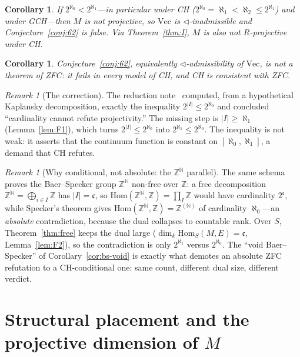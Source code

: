 \documentclass[11pt,reqno]{amsart}
\theoremstyle{plain}
\newtheorem{corollary}[theorem]{Corollary}
\theoremstyle{definition}
\theoremstyle{remark}
\newtheorem{remark}[theorem]{Remark}
\renewcommand{\Vec}{\mathrm{Vec}}
\newcommand{\Hom}{\mathrm{Hom}}
\newcommand{\tri}{\triangleleft}
\newcommand{\N}{\mathbb{N}}
\newcommand{\Z}{\mathbb{Z}}
\begin{document}
\begin{corollary}\label{cor:ch}
If $2^{\aleph_0}<2^{\aleph_1}$---in particular under CH ($2^{\aleph_0}=\aleph_1<\aleph_2\le 2^{\aleph_1}$) and under GCH---then $M$ is not projective, so $\Vec$ is $\tri$-inadmissible and Conjecture~\ref{conj:62} is false. Via Theorem~\ref{thm:I}, $M$ is also not $R$-projective under CH.
\end{corollary}

\begin{corollary}\label{cor:not-zfc}
Conjecture~\ref{conj:62}, equivalently $\tri$-admissibility of $\Vec$, is not a theorem of \textup{ZFC}: it fails in every model of CH, and CH is consistent with \textup{ZFC}.
\end{corollary}

\begin{remark}[The correction]
The reduction note~\cite[(P2)]{macbeth-reduction} computed, from a hypothetical Kaplansky decomposition, exactly the inequality $2^{|I|}\le 2^{\aleph_0}$ and concluded ``cardinality cannot refute projectivity.'' The missing step is $|I|\ge\aleph_1$ (Lemma~\ref{lem:F1}), which turns $2^{|I|}\le 2^{\aleph_0}$ into $2^{\aleph_1}\le 2^{\aleph_0}$. The inequality is not weak: it asserts that the continuum function is constant on $[\aleph_0,\aleph_1]$, a demand that CH refutes.
\end{remark}

\begin{remark}[Why conditional, not absolute: the $\Z^{\N}$ parallel]\label{rem:zn}
The same schema proves the Baer--Specker group $\Z^{\N}$ non-free over $\Z$: a free decomposition $\Z^{\N}=\bigoplus_{i\in I}\Z$ has $|I|=\mathfrak c$, so $\Hom(\Z^{\N},\Z)=\prod_I\Z$ would have cardinality $2^{\mathfrak c}$, while Specker's theorem gives $\Hom(\Z^{\N},\Z)=\Z^{(\N)}$ of cardinality $\aleph_0$---an \emph{absolute} contradiction, because the dual collapses to countable rank. Over $S$, Theorem~\ref{thm:free} keeps the dual large ($\dim_k\Hom_S(M,E)=\mathfrak c$, Lemma~\ref{lem:F2}), so the contradiction is only $2^{\aleph_1}$ versus $2^{\aleph_0}$. The ``void Baer--Specker'' of Corollary~\ref{cor:bs-void} is exactly what demotes an absolute ZFC refutation to a CH-conditional one: same count, different dual size, different verdict.
\end{remark}

\section{Structural placement and the projective dimension of \texorpdfstring{$M$}{M}}\label{sec:structure}
\end{document}
